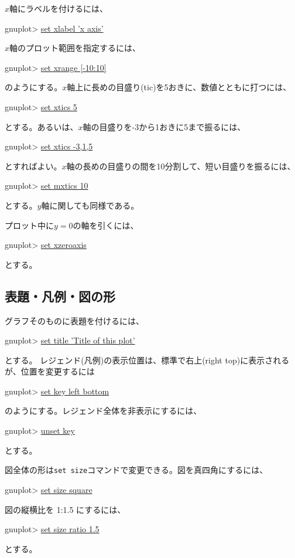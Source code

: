 $x$軸にラベルを付けるには、
\begin{commandline2}
gnuplot> \underline{set xlabel 'x axis'}
\end{commandline2} \noindent
$x$軸のプロット範囲を指定するには、
\begin{commandline2}
gnuplot> \underline{set xrange [-10:10]}
\end{commandline2} \noindent
のようにする。$x$軸上に長めの目盛り(tic)を5おきに、数値とともに打つには、
\begin{commandline2}
gnuplot> \underline{set xtics 5}
\end{commandline2} \noindent
とする。あるいは、$x$軸の目盛りを-3から1おきに5まで振るには、
\begin{commandline2}
gnuplot> \underline{set xtics -3,1,5}
\end{commandline2} \noindent
とすればよい。$x$軸の長めの目盛りの間を10分割して、短い目盛りを振るには、
\begin{commandline2}
gnuplot> \underline{set mxtics 10}
\end{commandline2} \noindent
とする。$y$軸に関しても同様である。

プロット中に$y=0$の軸を引くには、
\begin{commandline2}
gnuplot> \underline{set xzeroaxis}
\end{commandline2} \noindent
とする。

\subsection{表題・凡例・図の形}

グラフそのものに表題を付けるには、
\begin{commandline2}
gnuplot> \underline{set title 'Title of this plot'}
\end{commandline2} \noindent
とする。
レジェンド(凡例)の表示位置は、標準で右上(right top)に表示されるが、位置を変更するには
\begin{commandline2}
gnuplot> \underline{set key left bottom}
\end{commandline2} \noindent
のようにする。レジェンド全体を非表示にするには、
\begin{commandline2}
gnuplot> \underline{unset key}
\end{commandline2} \noindent
とする。

図全体の形は{\tt set size}コマンドで変更できる。図を真四角にするには、
\begin{commandline2}
gnuplot> \underline{set size square}
\end{commandline2} \noindent
図の縦横比を 1:1.5 にするには、
\begin{commandline2}
gnuplot> \underline{set size ratio 1.5}
\end{commandline2} \noindent
とする。

